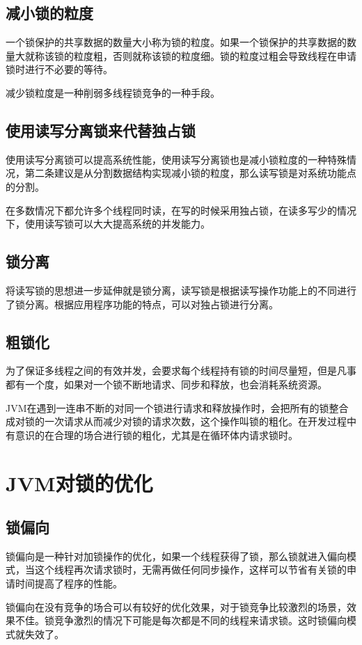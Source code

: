 \documentclass[a4paper]{report}
\begin{document}
\subsection{减小锁的粒度}
一个锁保护的共享数据的数量大小称为锁的粒度。如果一个锁保护的共享数据的数量大就称该锁的粒度粗，否则就称该锁的粒度细。锁的粒度过粗会导致线程在申请锁时进行不必要的等待。

减少锁粒度是一种削弱多线程锁竞争的一种手段。
\subsection{使用读写分离锁来代替独占锁}
使用读写分离锁可以提高系统性能，使用读写分离锁也是减小锁粒度的一种特殊情况，第二条建议是从分割数据结构实现减小锁的粒度，那么读写锁是对系统功能点的分割。

在多数情况下都允许多个线程同时读，在写的时候采用独占锁，在读多写少的情况下，使用读写锁可以大大提高系统的并发能力。

\subsection{锁分离}
将读写锁的思想进一步延伸就是锁分离，读写锁是根据读写操作功能上的不同进行了锁分离。根据应用程序功能的特点，可以对独占锁进行分离。
\subsection{粗锁化}
为了保证多线程之间的有效并发，会要求每个线程持有锁的时间尽量短，但是凡事都有一个度，如果对一个锁不断地请求、同步和释放，也会消耗系统资源。

JVM在遇到一连串不断的对同一个锁进行请求和释放操作时，会把所有的锁整合成对锁的一次请求从而减少对锁的请求次数，这个操作叫锁的粗化。在开发过程中有意识的在合理的场合进行锁的粗化，尤其是在循环体内请求锁时。
\section{JVM对锁的优化}
\subsection{锁偏向}
锁偏向是一种针对加锁操作的优化，如果一个线程获得了锁，那么锁就进入偏向模式，当这个线程再次请求锁时，无需再做任何同步操作，这样可以节省有关锁的申请时间提高了程序的性能。

锁偏向在没有竞争的场合可以有较好的优化效果，对于锁竞争比较激烈的场景，效果不佳。锁竞争激烈的情况下可能是每次都是不同的线程来请求锁。这时锁偏向模式就失效了。
\end{document}
